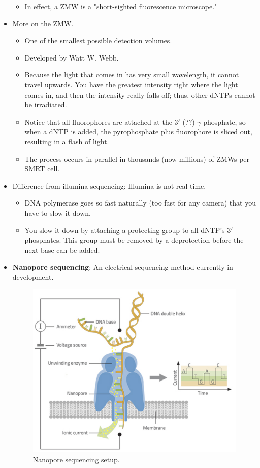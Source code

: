 \documentclass[../notes.tex]{subfiles}
\begin{document}
\begin{itemize}
\begin{itemize}
        \item In effect, a ZMW is a "short-sighted fluorescence microscope."
    \end{itemize}
    \item More on the ZMW.
    \begin{itemize}
        \item One of the smallest possible detection volumes.
        \item Developed by Watt W. Webb.
        \item Because the light that comes in has very small wavelength, it cannot travel upwards. You have the greatest intensity right where the light comes in, and then the intensity really falls off; thus, other dNTPs cannot be irradiated.
        \item Notice that all fluorophores are attached at the $3'$ (??) $\gamma$ phosphate, so when a dNTP is added, the pyrophosphate plus fluorophore is sliced out, resulting in a flash of light.
        \item The process occurs in parallel in thousands (now millions) of ZMWs per SMRT cell.
    \end{itemize}
    \item Difference from illumina sequencing: Illumina is not real time.
    \begin{itemize}
        \item DNA polymerase goes so fast naturally (too fast for any camera) that you have to slow it down.
        \item You slow it down by attaching a protecting group to all dNTP's $3'$ phosphates. This group must be removed by a deprotection before the next base can be added.
    \end{itemize}
    \item \textbf{Nanopore sequencing}: An electrical sequencing method currently in development.
    \begin{figure}[h!]
        \centering
        \includegraphics[width=0.4\linewidth]{../ExtFiles/sequencingNanopore.png}
        \caption{Nanopore sequencing setup.}
        \label{fig:sequencingNanopore}

\end{figure}
\end{itemize}
\end{document}

